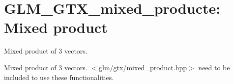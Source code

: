 \hypertarget{group__gtx__mixed__product}{\section{\-G\-L\-M\-\_\-\-G\-T\-X\-\_\-mixed\-\_\-producte\-: \-Mixed product}
\label{group__gtx__mixed__product}
}


\-Mixed product of 3 vectors.  


\-Mixed product of 3 vectors. $<$\hyperlink{mixed__product_8hpp}{glm/gtx/mixed\-\_\-product.\-hpp}$>$ need to be included to use these functionalities. 
